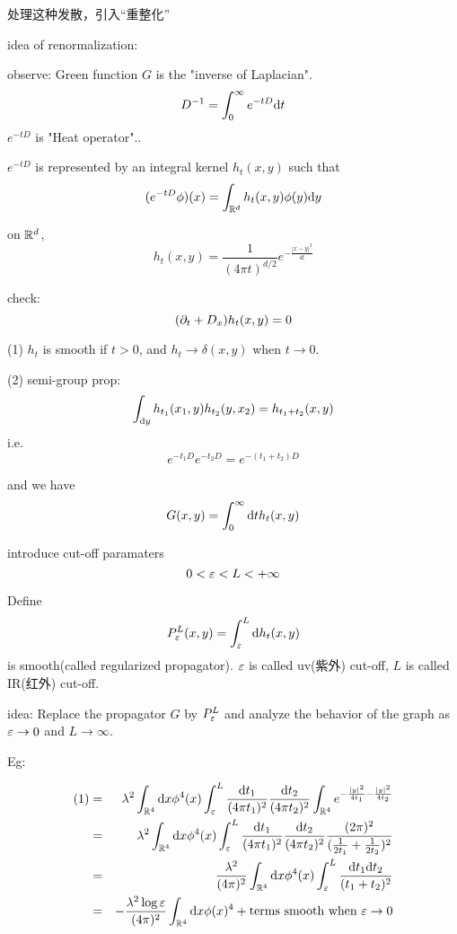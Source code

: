 处理这种发散，引入“重整化”

idea of renormalization:

observe: Green function $G$ is the "inverse of Laplacian".
$$D^{-1}=\int_0^\infty e^{-tD}\mathrm{d} t$$
$e^{-tD}$ is "Heat operator"..

$e^{-tD}$ is represented by an integral kernel
$h_t(x,y)$ such that
$$(e^{-tD}\phi)(x)=\int_{\mathbb{R}^d}h_t(x,y)\phi(y)\mathrm{d} y$$

on $\mathbb{R}^d$,
$$h_t(x,y)=\frac{1}{(4\pi t)^{d/2}}e^{-\frac{|x-y|^2}{4t}}$$

check:
$$(\partial_t+D_x)h_t(x,y)=0$$

\begin{prop}

(1) $h_t$ is smooth if $t>0$, and $h_t\to\delta(x,y)$ when $t\to 0$.

(2) semi-group prop:
$$\int_{\mathrm{d} y}h_{t_1}(x_1,y)h_{t_2}(y,x_2)=h_{t_1+t_2}(x,y)$$
i.e.
$$e^{-t_1 D}e^{-t_2D}=e^{-(t_1+t_2)D}$$
\end{prop}

and we have
$$G(x,y)=\int_0^\infty \mathrm{d} t h_t(x,y)$$

introduce cut-off paramaters
$$0<\varepsilon<L<+\infty$$

Define
$$P^L_{\varepsilon}(x,y)=\int_\varepsilon^L\mathrm{d} h_t(x,y)$$
is smooth(called regularized propagator).
$\varepsilon$ is called uv(紫外) cut-off,
$L$ is  called IR(红外) cut-off.

idea: Replace the propagator $G$ by $P^L_\varepsilon$
and analyze the behavior of the graph as $\varepsilon\to 0$ and $L\to\infty$.

Eg:


\begin{eqnarray*}
     (1)
&=&
     \lambda^2\int_{\mathbb{R}^4}
       \mathrm{d} x\phi^4(x)
         \int_\varepsilon^L
           \frac{\mathrm{d} t_1}{(4\pi t_1)^2}
           \frac{\mathrm{d} t_2}{(4\pi t_2)^2}
             \int_{\mathbb{R}^4}
               e^{-\frac{|y|^2}{4t_1}-\frac{|y|^2}{4t_2}}\\
&=&
     \lambda^2\int_{\mathbb{R}^4}
       \mathrm{d} x\phi^4(x)
         \int_\varepsilon^L
           \frac{\mathrm{d} t_1}{(4\pi t_1)^2}
           \frac{\mathrm{d} t_2}{(4\pi t_2)^2}
           \frac{(2\pi)^2}{(\frac{1}{2t_1}+\frac{1}{2t_2})^2}\\
&=&
     \frac{\lambda^2}{(4\pi)^2}
     \int_{\mathbb{R}^4}
       \mathrm{d} x\phi^4(x)
       \int_\varepsilon^L
         \frac{\mathrm{d} t_1\mathrm{d} t_2}{(t_1+t_2)^2}\\
&=&
     -\frac{\lambda^2\log\varepsilon}{(4\pi)^2}
     \int_{\mathbb{R}^4}\mathrm{d} x \phi(x)^4
     +\text{terms smooth when $\varepsilon\to 0$}
\end{eqnarray*}

